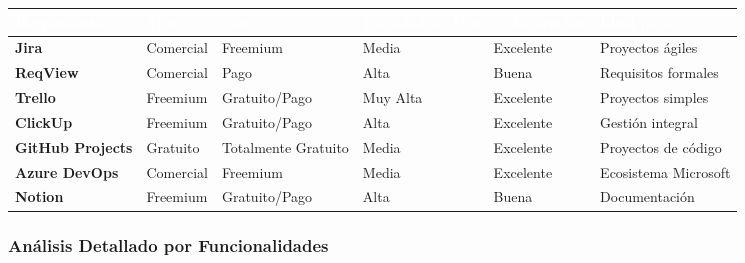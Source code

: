 \documentclass[12pt,a4paper]{article}
\begin{document}
\begin{longtable}{|p{2.5cm}|p{2cm}|p{2cm}|p{2cm}|p{2cm}|p{2.5cm}|}
\hline
\rowcolor{headercolor}
\textcolor{white}{\textbf{Herramienta}} & 
\textcolor{white}{\textbf{Tipo}} & 
\textcolor{white}{\textbf{Costo}} & 
\textcolor{white}{\textbf{Facilidad de Uso}} & 
\textcolor{white}{\textbf{Colaboración}} & 
\textcolor{white}{\textbf{Ideal para}} \\
\hline

\textbf{Jira} & 
Comercial & 
Freemium & 
Media & 
Excelente & 
Proyectos ágiles \\
\hline
\rowcolor{lightgray}

\textbf{ReqView} & 
Comercial & 
Pago & 
Alta & 
Buena & 
Requisitos formales \\
\hline

\textbf{Trello} & 
Freemium & 
Gratuito/Pago & 
Muy Alta & 
Excelente & 
Proyectos simples \\
\hline
\rowcolor{lightgray}

\textbf{ClickUp} & 
Freemium & 
Gratuito/Pago & 
Alta & 
Excelente & 
Gestión integral \\
\hline

\textbf{GitHub Projects} & 
Gratuito & 
Totalmente Gratuito & 
Media & 
Excelente & 
Proyectos de código \\
\hline
\rowcolor{lightgray}

\textbf{Azure DevOps} & 
Comercial & 
Freemium & 
Media & 
Excelente & 
Ecosistema Microsoft \\
\hline

\textbf{Notion} & 
Freemium & 
Gratuito/Pago & 
Alta & 
Buena & 
Documentación \\
\hline

\end{longtable}

\subsubsection{Análisis Detallado por Funcionalidades}
\end{document}
